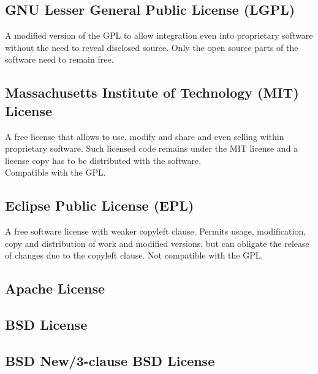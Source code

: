 \documentclass[10pt, a4paper, final]{article}
\begin{document}
\subsection*{GNU Lesser General Public License (LGPL)}

A modified version of the GPL to allow integration even into proprietary software without the need to reveal disclosed source.
Only the open source parts of the software need to remain free.\\

\subsection*{Massachusetts Institute of Technology (MIT) License}

A free license that allows to use, modify and share and even selling within proprietary software.
Such licensed code remains under the MIT license and a license copy has to be distributed with the software.\\
Compatible with the GPL.

\subsection*{Eclipse Public License (EPL)}

A free software license with weaker copyleft clause. Permits usage, modification, copy and distribution of work and modified versions,
but can obligate the release of changes due to the copyleft clause.
Not compatible with the GPL.

\subsection*{Apache License}



\subsection*{BSD License}

\subsection*{BSD New/3-clause BSD License}
\end{document}
